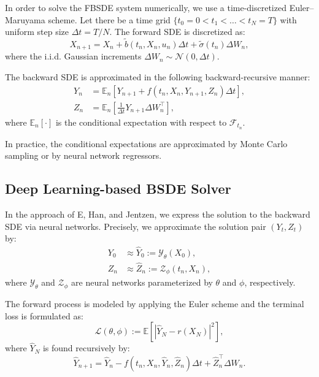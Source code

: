 \documentclass[11pt]{article}
\def\w{\widetilde}
\begin{document}
In order to solve the FBSDE system numerically, we use a time-discretized Euler--Maruyama scheme. Let there be a time grid $\{t_0 = 0 < t_1 < \dots < t_N = T\}$ with uniform step size $\Delta t = T/N$. The forward SDE is discretized as:
\begin{equation}
X_{n+1} = X_n + \w{b}(t_n, X_n, u_n) \Delta t + \w{\sigma}(t_n) \Delta W_n,
\end{equation}
where the i.i.d. Gaussian increments $\Delta W_n \sim \mathcal{N}(0, \Delta t)$.

The backward SDE is approximated in the following backward-recursive manner:
\begin{align}
Y_n &= \mathbb{E}_n \left[ Y_{n+1} + f(t_n, X_n, Y_{n+1}, Z_n) \Delta t \right], \\
Z_n &= \mathbb{E}_n \left[ \frac{1}{\Delta t} Y_{n+1} \Delta W_n^\top \right],
\end{align}
where $\mathbb{E}_n[\cdot]$ is the conditional expectation with respect to $\mathcal{F}_{t_n}$.

In practice, the conditional expectations are approximated by Monte Carlo sampling or by neural network regressors.

\subsection{Deep Learning-based BSDE Solver}

In the approach of E, Han, and Jentzen, we express the solution to the backward SDE via neural networks. Precisely, we approximate the solution pair $(Y_t,Z_t)$ by:
\begin{align}
Y_0 &\approx \hat{Y}_0 := \mathcal{Y}_\theta(X_0), \\
Z_n &\approx \hat{Z}_n := \mathcal{Z}_\phi(t_n, X_n),
\end{align}
where $\mathcal{Y}_\theta$ and $\mathcal{Z}_\phi$ are neural networks parameterized by $\theta$ and $\phi$, respectively.

The forward process is modeled by applying the Euler scheme and the terminal loss is formulated as:
\begin{equation}
\mathcal{L}(\theta, \phi) := \mathbb{E} \left[ \left| \hat{Y}_N - r(X_N) \right|^2 \right],
\end{equation}
where $\hat{Y}_N$ is found recursively by:
\begin{equation}
\hat{Y}_{n+1} = \hat{Y}_n - f(t_n, X_n, \hat{Y}_n, \hat{Z}_n) \Delta t + \hat{Z}_n^\top \Delta W_n.
\end{equation}
\end{document}
